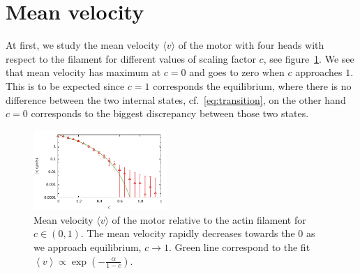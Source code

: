 \documentclass[aps,pre,twocolumn,showpacs,showkeys]{revtex4-1}
\begin{document}
\section{Mean velocity}
\label{sec:velocity}
At first, we study the mean velocity $\langle v\rangle$ of the motor with four heads with respect to the filament for different values of scaling factor $c$, see figure~\ref{Fig: c_v}.
We see that mean velocity has maximum at $c=0$ and goes to zero when $c$ approaches $1$. 
This is to be expected since $c=1$ corresponds the equilibrium, where there is no difference between the two internal states, cf.~\eqref{eq:transition},
on the other hand $c=0$ corresponds to the biggest discrepancy between those two states. 
\begin{figure}[t]
\centering
\includegraphics[width=0.45\textwidth,height=!]{c_v_4heads}
\caption{Mean velocity $\langle v \rangle$ of the motor relative to the actin filament for $c \in (0,1)$.
The mean velocity rapidly decreases towards the $0$ as we approach equilibrium, $c \to 1$.  
Green line correspond to the fit $ \left\langle v \right\rangle \propto \exp ( - \frac{\alpha}{1-c} ) $.
} 
\label{Fig: c_v}
\end{figure}
\end{document}
